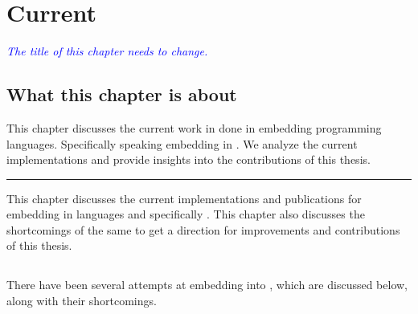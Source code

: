 \documentclass[thesis-solanki.tex]{subfiles}
\begin{document}
\chapter{Current}\label{chap:proposedWork}

\textcolor{blue}{\textsl{The title of this chapter needs to change.}}

\section{What this chapter is about}\label{sec:what-this-chapter:proposedWork}

This chapter discusses the current work in done in embedding programming languages.
Specifically speaking embedding  in .
We analyze the current implementations and provide insights into the contributions of this thesis.

\noindent\rule{\textwidth}{0.5pt}

This chapter discusses the current implementations and publications for embedding  in languages
and specifically .
This chapter also discusses the shortcomings of the same to get a direction for improvements and contributions of
this thesis.

\section{} \label{sec:existing-work-by-others}

There have been several attempts at embedding  into , which are
discussed below, along with their shortcomings.
\end{document}
